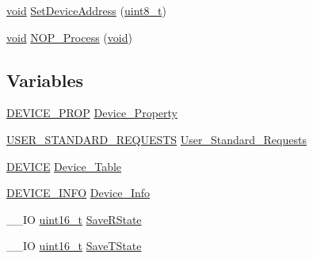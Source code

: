 \begin{DoxyCompactItemize}
\item 
\hyperlink{group___n_a_m_e_ga18028b8badbf1ea7e704ccac3c488e82}{void} \hyperlink{_s_t_m32_f10x_2_libraries_2_s_t_m32___u_s_b-_f_s-_device___driver_2inc_2usb__core_8h_afcdbe02cf447bb583c34dd9babbd9f5a}{Set\-Device\-Address} (\hyperlink{stdint_8h_aba7bc1797add20fe3efdf37ced1182c5}{uint8\-\_\-t})
\item 
\hyperlink{group___n_a_m_e_ga18028b8badbf1ea7e704ccac3c488e82}{void} \hyperlink{_s_t_m32_f10x_2_libraries_2_s_t_m32___u_s_b-_f_s-_device___driver_2inc_2usb__core_8h_a5576d2ea5bf87fec71925b8e20048e74}{N\-O\-P\-\_\-\-Process} (\hyperlink{group___n_a_m_e_ga18028b8badbf1ea7e704ccac3c488e82}{void})
\end{DoxyCompactItemize}
\subsection*{Variables}
\begin{DoxyCompactItemize}
\item 
\hyperlink{_s_t_m32_f10x_2_libraries_2_s_t_m32___u_s_b-_f_s-_device___driver_2inc_2usb__core_8h_a90353becd4185446508b796a7f39fbce}{D\-E\-V\-I\-C\-E\-\_\-\-P\-R\-O\-P} \hyperlink{group___p_i_o_s___u_s_b_h_o_o_k_ga646bdfc60e69ee637f2c39b5bb91dfec}{Device\-\_\-\-Property}
\item 
\hyperlink{_s_t_m32_f10x_2_libraries_2_s_t_m32___u_s_b-_f_s-_device___driver_2inc_2usb__core_8h_abf9887b82ae511cfb155d0d97c9a7c1a}{U\-S\-E\-R\-\_\-\-S\-T\-A\-N\-D\-A\-R\-D\-\_\-\-R\-E\-Q\-U\-E\-S\-T\-S} \hyperlink{group___p_i_o_s___u_s_b_h_o_o_k_ga8d70d0a7e05cf9c172e4304def6b65b8}{User\-\_\-\-Standard\-\_\-\-Requests}
\item 
\hyperlink{_s_t_m32_f10x_2_libraries_2_s_t_m32___u_s_b-_f_s-_device___driver_2inc_2usb__core_8h_a85594805bde95346bc3a19853317a89d}{D\-E\-V\-I\-C\-E} \hyperlink{group___p_i_o_s___u_s_b_h_o_o_k_gafa47e7c7d5d6fb4c682e16c89c1b7d75}{Device\-\_\-\-Table}
\item 
\hyperlink{_s_t_m32_f10x_2_libraries_2_s_t_m32___u_s_b-_f_s-_device___driver_2inc_2usb__core_8h_a6c959d0e0181f5f4b6a8b6b3f8e16760}{D\-E\-V\-I\-C\-E\-\_\-\-I\-N\-F\-O} \hyperlink{_s_t_m32_f10x_2_libraries_2_s_t_m32___u_s_b-_f_s-_device___driver_2inc_2usb__core_8h_aafdb1c0ee02432099324e826f25d0844}{Device\-\_\-\-Info}
\item 
\-\_\-\-\_\-\-I\-O \hyperlink{stdint_8h_a273cf69d639a59973b6019625df33e30}{uint16\-\_\-t} \hyperlink{_s_t_m32_f10x_2_libraries_2_s_t_m32___u_s_b-_f_s-_device___driver_2inc_2usb__core_8h_a647971c82714959babba9a403a2dc4e9}{Save\-R\-State}
\item 
\-\_\-\-\_\-\-I\-O \hyperlink{stdint_8h_a273cf69d639a59973b6019625df33e30}{uint16\-\_\-t} \hyperlink{_s_t_m32_f10x_2_libraries_2_s_t_m32___u_s_b-_f_s-_device___driver_2inc_2usb__core_8h_aa31db46e856400b3248915ee8cd589a0}{Save\-T\-State}
\end{DoxyCompactItemize}


